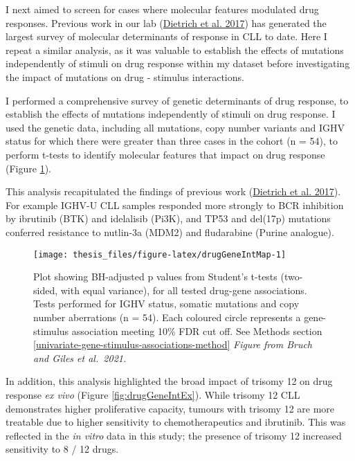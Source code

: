 \documentclass[11pt, a4paper, twosided]{book}
\begin{document}
I next aimed to screen for cases where molecular features modulated drug responses. Previous work in our lab (\protect\hyperlink{ref-JCIpaper}{Dietrich et al. 2017}) has generated the largest survey of molecular determinants of response in CLL to date. Here I repeat a similar analysis, as it was valuable to establish the effects of mutations independently of stimuli on drug response within my dataset before investigating the impact of mutations on drug - stimulus interactions.

I performed a comprehensive survey of genetic determinants of drug response, to establish the effects of mutations independently of stimuli on drug response. I used the genetic data, including all mutations, copy number variants and IGHV status for which there were greater than three cases in the cohort (n = 54), to perform t-tests to identify molecular features that impact on drug response (Figure \ref{fig:drugGeneIntMap}).

This analysis recapitulated the findings of previous work (\protect\hyperlink{ref-JCIpaper}{Dietrich et al. 2017}). For example IGHV-U CLL samples responded more strongly to BCR inhibition by ibrutinib (BTK) and idelalisib (Pi3K), and TP53 and del(17p) mutations conferred resistance to nutlin-3a (MDM2) and fludarabine (Purine analogue).


\begin{figure}

{\centering \texttt{[image: thesis\_files/figure-latex/drugGeneIntMap-1]} 

}

\caption{Plot showing BH-adjusted p values from Student's t-tests (two-sided, with equal variance), for all tested drug-gene associations. Tests performed for IGHV status, somatic mutations and copy number aberrations (n = 54). Each coloured circle represents a gene-stimulus association meeting 10\% FDR cut off. See Methods section \ref{univariate-gene-stimulus-associations-method} \emph{Figure from Bruch and Giles et al.~2021.}}\label{fig:drugGeneIntMap}
\end{figure}
In addition, this analysis highlighted the broad impact of trisomy 12 on drug response \emph{ex vivo} (Figure \ref{fig:drugGeneIntEx}). While trisomy 12 CLL demonstrates higher proliferative capacity, tumours with trisomy 12 are more treatable due to higher sensitivity to chemotherapeutics and ibrutinib. This was reflected in the \emph{in vitro} data in this study; the presence of trisomy 12 increased sensitivity to 8 / 12 drugs.
\end{document}
